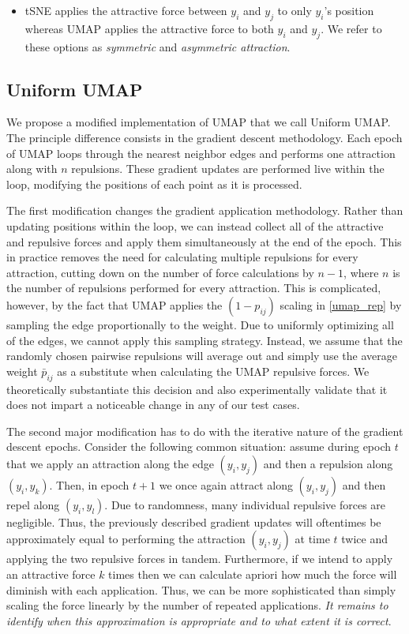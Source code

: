 \documentclass{article}
\theoremstyle{definition}
\begin{document}
\begin{multicols}{2}
\begin{itemize}
    \item tSNE applies the attractive force between $y_i$ and $y_j$ to only $y_i$'s position whereas UMAP applies the attractive force to both $y_i$ and $y_j$.
        We refer to these options as \textit{symmetric} and \textit{asymmetric attraction}.
\end{itemize}

\subsection{Uniform UMAP}
We propose a modified implementation of UMAP that we call Uniform UMAP. The principle difference consists in the gradient descent methodology. Each epoch of
UMAP loops through the nearest neighbor edges and performs one attraction along with $n$ repulsions. These gradient updates are performed live within the loop,
modifying the positions of each point as it is processed.

The first modification changes the gradient application methodology. Rather than updating positions within the loop, we can instead collect all of the
attractive and repulsive forces and apply them simultaneously at the end of the epoch. This in practice removes the need for calculating multiple repulsions
for every attraction, cutting down on the number of force calculations by $n-1$, where $n$ is the number of repulsions performed for every attraction. This is
complicated, however, by the fact that UMAP applies the $(1 - p_{ij})$ scaling in \ref{umap_rep} by sampling the edge proportionally to the weight. Due to
uniformly optimizing all of the edges, we cannot apply this sampling strategy. Instead, we assume that the randomly chosen pairwise repulsions will average out
and simply use the average weight $\bar{p}_{ij}$ as a substitute when calculating the UMAP repulsive forces. We theoretically substantiate this decision and
also experimentally validate that it does not impart a noticeable change in any of our test cases.

The second major modification has to do with the iterative nature of the gradient descent epochs. Consider the following common situation: assume during
epoch $t$ that we apply an attraction along the edge $(y_i, y_j)$ and then a repulsion along $(y_i, y_k)$. Then, in epoch $t+1$ we once again attract along
$(y_i, y_j)$ and then repel along $(y_i, y_l)$. Due to randomness, many individual repulsive forces are negligible. Thus, the previously described gradient
updates will oftentimes be approximately equal to performing the attraction $(y_i, y_j)$ at time $t$ twice and applying the two repulsive forces in tandem.
Furthermore, if we intend to apply an attractive force $k$ times then we can calculate apriori how much the force will diminish with each application. Thus, we can be
more sophisticated than simply scaling the force linearly by the number of repeated applications. \textit{It remains to identify when this approximation is appropriate
and to what extent it is correct}.


\end{multicols}
\end{document}
